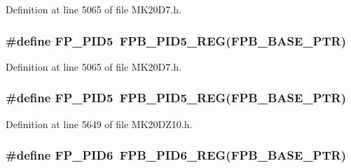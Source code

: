 Definition at line 5065 of file M\+K20\+D7.\+h.

\subsubsection[{\texorpdfstring{F\+P\+\_\+\+P\+I\+D5}{FP_PID5}}]{\setlength{\rightskip}{0pt plus 5cm}\#define F\+P\+\_\+\+P\+I\+D5~{\bf F\+P\+B\+\_\+\+P\+I\+D5\+\_\+\+R\+EG}({\bf F\+P\+B\+\_\+\+B\+A\+S\+E\+\_\+\+P\+TR})}\hypertarget{group___f_p_b___register___accessor___macros_ga190084c874ad19b34e1bf55c690e62d9}{}\label{group___f_p_b___register___accessor___macros_ga190084c874ad19b34e1bf55c690e62d9}


Definition at line 5065 of file M\+K20\+D7.\+h.

\subsubsection[{\texorpdfstring{F\+P\+\_\+\+P\+I\+D5}{FP_PID5}}]{\setlength{\rightskip}{0pt plus 5cm}\#define F\+P\+\_\+\+P\+I\+D5~{\bf F\+P\+B\+\_\+\+P\+I\+D5\+\_\+\+R\+EG}({\bf F\+P\+B\+\_\+\+B\+A\+S\+E\+\_\+\+P\+TR})}\hypertarget{group___f_p_b___register___accessor___macros_ga190084c874ad19b34e1bf55c690e62d9}{}\label{group___f_p_b___register___accessor___macros_ga190084c874ad19b34e1bf55c690e62d9}


Definition at line 5649 of file M\+K20\+D\+Z10.\+h.

\subsubsection[{\texorpdfstring{F\+P\+\_\+\+P\+I\+D6}{FP_PID6}}]{\setlength{\rightskip}{0pt plus 5cm}\#define F\+P\+\_\+\+P\+I\+D6~{\bf F\+P\+B\+\_\+\+P\+I\+D6\+\_\+\+R\+EG}({\bf F\+P\+B\+\_\+\+B\+A\+S\+E\+\_\+\+P\+TR})}\hypertarget{group___f_p_b___register___accessor___macros_ga76fcd3f55c4ee8a9c6dda02c17106bab}{}\label{group___f_p_b___register___accessor___macros_ga76fcd3f55c4ee8a9c6dda02c17106bab}



